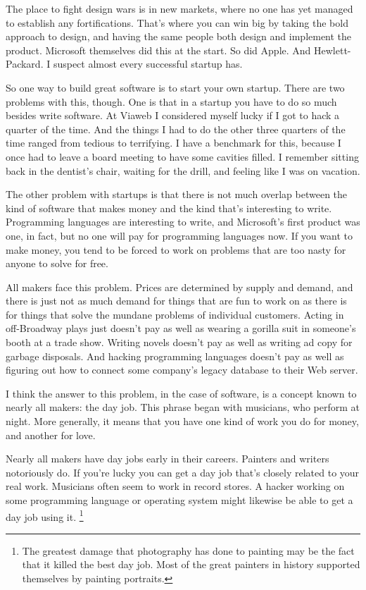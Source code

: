 \documentclass[12pt]{book}
\begin{document}
The place to fight design wars is in new markets, where no one has yet
managed to establish any fortifications. That's where you can win big by
taking the bold approach to design, and having the same people both
design and implement the product. Microsoft themselves did this at the
start. So did Apple. And Hewlett-Packard. I suspect almost every
successful startup has.

So one way to build great software is to start your own startup. There
are two problems with this, though. One is that in a startup you have to
do so much besides write software. At Viaweb I considered myself lucky
if I got to hack a quarter of the time. And the things I had to do the
other three quarters of the time ranged from tedious to terrifying. I
have a benchmark for this, because I once had to leave a board meeting
to have some cavities filled. I remember sitting back in the dentist's
chair, waiting for the drill, and feeling like I was on vacation.

The other problem with startups is that there is not much overlap
between the kind of software that makes money and the kind that's
interesting to write. Programming languages are interesting to write,
and Microsoft's first product was one, in fact, but no one will pay for
programming languages now. If you want to make money, you tend to be
forced to work on problems that are too nasty for anyone to solve for
free.

All makers face this problem. Prices are determined by supply and
demand, and there is just not as much demand for things that are fun to
work on as there is for things that solve the mundane problems of
individual customers. Acting in off-Broadway plays just doesn't pay as
well as wearing a gorilla suit in someone's booth at a trade show.
Writing novels doesn't pay as well as writing ad copy for garbage
disposals. And hacking programming languages doesn't pay as well as
figuring out how to connect some company's legacy database to their Web
server.

I think the answer to this problem, in the case of software, is a
concept known to nearly all makers: the day job. This phrase began with
musicians, who perform at night. More generally, it means that you have
one kind of work you do for money, and another for love.

Nearly all makers have day jobs early in their careers. Painters and
writers notoriously do. If you're lucky you can get a day job that's
closely related to your real work. Musicians often seem to work in
record stores. A hacker working on some programming language or
operating system might likewise be able to get a day job using it.
\footnote{The greatest damage that photography has done to painting may be
the fact that it killed the best day job. Most of the great painters in
history supported themselves by painting portraits.}
\end{document}
